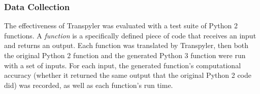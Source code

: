 \subsubsection{Data Collection}
The effectiveness of Transpyler was evaluated with a test suite of Python 2 functions. A \textit{function} is a specifically defined piece of code that receives an input and returns an output. Each function was translated by Transpyler, then both the original Python 2 function and the generated Python 3 function were run with a set of inputs. For each input, the generated function's computational accuracy (whether it returned the same output that the original Python 2 code did) was recorded, as well as each function's run time.